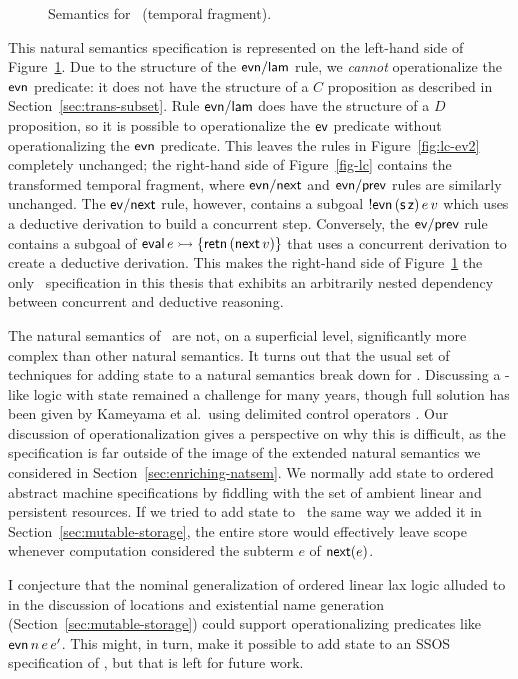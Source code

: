\begin{figure}[tp]
\begin{minipage}[b]{0.450\linewidth}
\end{minipage}
\hspace{0.5cm}
\begin{minipage}[b]{0.50\linewidth}
\end{minipage}
\caption{Semantics for \rowan~(temporal fragment).}
\label{fig:lc}
\end{figure}

This natural semantics specification is represented on the left-hand
side of Figure~\ref{fig:lc}. Due to the structure of the ${\sf
  evn/lam}$ rule, we {\it cannot} operationalize the ${\sf evn}$
predicate: it does not have the structure of a $C$ proposition as
described in Section~\ref{sec:trans-subset}. Rule ${\sf evn/lam}$ does
have the structure of a $D$ proposition, so it is possible to
operationalize the ${\sf ev}$ predicate without operationalizing the
${\sf evn}$ predicate. This leaves the rules in
Figure~\ref{fig:lc-ev2} completely unchanged; the right-hand side of
Figure~\ref{fig-lc} contains the transformed temporal fragment,
where ${\sf evn/next}$ and ${\sf evn/prev}$ rules are similarly unchanged. 
The
${\sf ev/next}$ rule, however,
contains a subgoal ${!}{\sf evn}\,({\sf s}\,{\sf
  z})\,e\,v$ which uses a deductive derivation to build a concurrent
step. Conversely, the ${\sf ev/prev}$ rule contains a subgoal of ${\sf
  eval}\,e \rightarrowtail \{ {\sf retn}\,({\sf next}\,v) \}$ that uses
a concurrent derivation to create a deductive derivation.  This makes the
right-hand side of Figure~\ref{fig:lc} the only \sls~specification in
this thesis that exhibits an arbitrarily nested dependency between
concurrent and deductive reasoning.

The natural semantics of \rowan~are not, on a superficial level,
significantly more complex than other natural semantics.   It
turns out that the usual set of techniques for adding state
to a natural semantics break down for \rowan. Discussing a \rowan-like
logic with state remained a challenge for many years, though full
solution has been given by Kameyama et al.~using delimited control
operators \cite{kameyama11shifting}. Our discussion of
operationalization gives a perspective on why this is difficult, as the
specification is far outside of the image of the extended natural
semantics we considered in Section~\ref{sec:enriching-natsem}.  We
normally add state to ordered abstract machine specifications by
fiddling with the set of ambient linear and persistent resources.  If
we tried to add state to \rowan~the same way we added it in
Section~\ref{sec:mutable-storage}, the entire store would effectively
leave scope whenever computation considered the subterm $e$ of ${\sf
  next}(e)$.

I conjecture that the nominal generalization of ordered linear lax
logic alluded to in the discussion of locations and existential name
generation (Section~\ref{sec:mutable-storage}) could support
operationalizing predicates like ${\sf evn}\,n\,e\,e'$. This might, in
turn, make it possible to add state to an SSOS specification of
\rowan, but that is left for future work.

